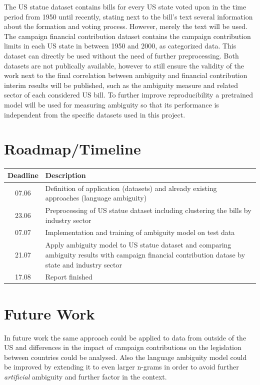 \documentclass[a4paper, 12pt]{article}
\begin{document}
The US statue dataset contains bills for every US state voted upon in the time period from 1950 until recently, stating next to the bill's text several information about the formation and voting process. However, merely the text will be used.
\newline
The campaign financial contribution dataset contains the campaign contribution limits in each US state in between 1950 and 2000, as categorized data. This dataset can directly be used without the need of further preprocessing.
\newline
Both datasets are not publically available, however to still ensure the validity of the work next to the final correlation between ambiguity and financial contribution interim results will be published, such as the ambiguity measure and related sector of each considered US bill. To further improve reproducibility a pretrained model will be used for measuring ambiguity so that its performance is independent from the specific datasets used in this project. 

\section*{Roadmap/Timeline}

\begin{tabular}{c|p{10cm}}
Deadline & Description \\
\hline
07.06 & Definition of application (datasets) and already existing approaches
(language ambiguity) \\
23.06 & Preprocessing of US statue dataset including clustering the bills by
industry sector \\
07.07 & Implementation and training of ambiguity model on test data \\
21.07 & Apply ambiguity model to US statue dataset and comparing ambiguity results with campaign financial contribution datase by state and industry sector \\
17.08 & Report finished
\end{tabular}

\section*{Future Work}
In future work the same approach could be applied to data from outside of the US and differences in the impact of campaign contributions on the legislation between countries could be analysed. Also the language ambiguity model could be improved by extending it to even larger n-grams in order to avoid further \textit{artificial} ambiguity and further factor in the context.

\newpage


\end{document}
